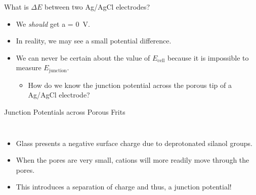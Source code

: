 \documentclass[notes=show]{beamer}
\begin{document}
\begin{frame}{What is $\Delta E$ between two Ag/AgCl electrodes?}
	\begin{itemize}
		\item<1-> We \emph{should} get a 
			= \SI{0}{\volt}.
		\item<2-> In reality, we may see a small potential difference.
	
		\item<4-> We can \alert{never} be certain about the value of
			$E_\text{cell}$ because it is \alert{impossible} to
			measure $E_\text{junction}$.
			\begin{itemize}
				\item How do we know the junction potential
					across the porous tip of a Ag/AgCl
					electrode?
			\end{itemize}
	\end{itemize}
\end{frame}

\begin{frame}{Junction Potentials across Porous Frits}
	\begin{columns}
		\begin{itemize}
			\item Glass presents a negative surface charge due to
				deprotonated silanol groups.
			\item When the pores are very small,\footnotemark{}
				cations will more readily move through the
				pores.
			\item This introduces a separation of charge and thus, a
				junction potential!
		\end{itemize}
	\end{columns}
	
\end{frame}
\end{document}
